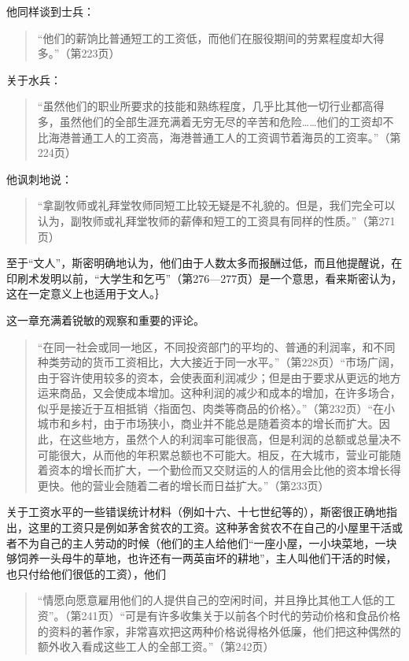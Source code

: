 他同样谈到士兵：

\begin{quote}{“他们的薪饷比普通短工的工资低，而他们在服役期间的劳累程度却大得多。”（第223页）}\end{quote}

关于水兵：

\begin{quote}{“虽然他们的职业所要求的技能和熟练程度，几乎比其他一切行业都高得多，虽然他们的全部生涯充满着无穷无尽的辛苦和危险……他们的工资却不比海港普通工人的工资高，海港普通工人的工资调节着海员的工资率。”（第224页）}\end{quote}

他讽刺地说：

\begin{quote}{“拿副牧师或礼拜堂牧师同短工比较无疑是不礼貌的。但是，我们完全可以认为，副牧师或礼拜堂牧师的薪俸和短工的工资具有同样的性质。”（第271页）}\end{quote}

至于“文人”，斯密明确地认为，他们由于人数太多而报酬过低，而且他提醒说，在印刷术发明以前，“大学生和乞丐”（第276—277页）是一个意思，看来斯密认为，这在一定意义上也适用于文人。｝

这一章充满着锐敏的观察和重要的评论。

\begin{quote}{“在同一社会或同一地区，不同投资部门的平均的、普通的利润率，和不同种类劳动的货币工资相比，大大接近于同一水平。”（第228页）“市场广阔，由于容许使用较多的资本，会使表面利润减少；但是由于要求从更远的地方运来商品，又会使成本增加。这种利润的减少和成本的增加，在许多场合，似乎是接近于互相抵销〈指面包、肉类等商品的价格〉。”（第232页）“在小城市和乡村，由于市场狭小，商业并不能总是随着资本的增长而扩大。因此，在这些地方，虽然个人的利润率可能很高，但是利润的总额或总量决不可能很大，从而他的年积累总额也不可能大。相反，在大城市，营业可能随着资本的增长而扩大，一个勤俭而又交财运的人的信用会比他的资本增长得更快。他的营业会随着二者的增长而日益扩大。”（第233页）}\end{quote}

关于工资水平的一些错误统计材料（例如十六、十七世纪等的），斯密很正确地指出，这里的工资只是例如茅舍贫农的工资。这种茅舍贫农不在自己的小屋里干活或者不为自己的主人劳动的时候（他们的主人给他们“一座小屋，一小块菜地，一块够饲养一头母牛的草地，也许还有一两英亩坏的耕地”，主人叫他们干活的时候，也只付给他们很低的工资），他们

\begin{quote}{“情愿向愿意雇用他们的人提供自己的空闲时间，并且挣比其他工人低的工资”。（第241页）“可是有许多收集关于以前各个时代的劳动价格和食品价格的资料的著作家，非常喜欢把这两种价格说得格外低廉，他们把这种偶然的额外收入看成这些工人的全部工资。”（第242页）}\end{quote}

